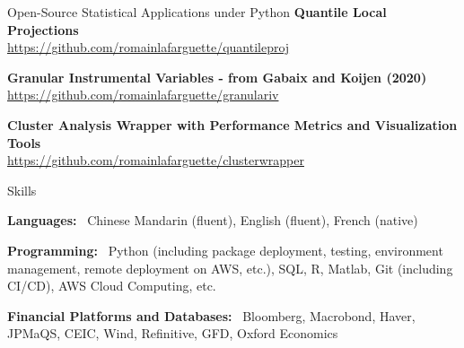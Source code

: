\documentclass[usegeometry, 10pt, a4paper]{cv} %
\newcommand{\activite}[1]{\textbf{#1}\ }
\begin{document}
\begin{rubriquetableau}[0.95\textwidth]{Open-Source Statistical Applications under Python}
\small
\activite{Quantile Local Projections} \\
\hspace{0.6cm} \small{\url{https://github.com/romainlafarguette/quantileproj}}
\vspace{0.4cm} 

\small
\activite{Granular Instrumental Variables - from Gabaix and Koijen (2020)} \\
\hspace{0.6cm} \small{\url{https://github.com/romainlafarguette/granulariv}}
\vspace{0.4cm} 

\small
\activite{Cluster Analysis Wrapper with Performance Metrics and Visualization Tools} \\
\hspace{0.6cm} \small{\url{https://github.com/romainlafarguette/clusterwrapper}}
\vspace{0.4cm} 

\end{rubriquetableau}

\begin{rubriquetableau}[0.95\textwidth]{Skills}\\
  \vspace{-0.5cm}

\activite{Languages:} Chinese Mandarin (fluent), English (fluent), French (native)\\

  \vspace{0.4cm}

\activite{Programming:} Python (including package deployment, testing, environment management, remote deployment on AWS, etc.),  SQL, \textsf{R}, Matlab, Git (including CI/CD), AWS Cloud Computing, etc. \\

  \vspace{0.4cm}

\activite{Financial Platforms and Databases:} Bloomberg, Macrobond, Haver, JPMaQS, CEIC, Wind, Refinitive, GFD, Oxford Economics

\end{rubriquetableau}


\end{document}
